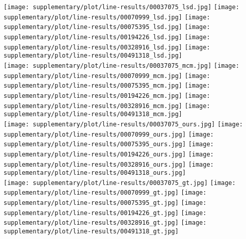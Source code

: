 \documentclass[10pt,twocolumn,letterpaper]{article}
\begin{document}
\begin{figure*}[t]
\centering
\texttt{[image: supplementary/plot/line-results/00037075\_lsd.jpg]}
\texttt{[image: supplementary/plot/line-results/00070999\_lsd.jpg]}
\texttt{[image: supplementary/plot/line-results/00075395\_lsd.jpg]}
\texttt{[image: supplementary/plot/line-results/00194226\_lsd.jpg]}
\texttt{[image: supplementary/plot/line-results/00328916\_lsd.jpg]}
\texttt{[image: supplementary/plot/line-results/00491318\_lsd.jpg]}
\\
\texttt{[image: supplementary/plot/line-results/00037075\_mcm.jpg]}
\texttt{[image: supplementary/plot/line-results/00070999\_mcm.jpg]}
\texttt{[image: supplementary/plot/line-results/00075395\_mcm.jpg]}
\texttt{[image: supplementary/plot/line-results/00194226\_mcm.jpg]}
\texttt{[image: supplementary/plot/line-results/00328916\_mcm.jpg]}
\texttt{[image: supplementary/plot/line-results/00491318\_mcm.jpg]}
\\
\texttt{[image: supplementary/plot/line-results/00037075\_ours.jpg]}
\texttt{[image: supplementary/plot/line-results/00070999\_ours.jpg]}
\texttt{[image: supplementary/plot/line-results/00075395\_ours.jpg]}
\texttt{[image: supplementary/plot/line-results/00194226\_ours.jpg]}
\texttt{[image: supplementary/plot/line-results/00328916\_ours.jpg]}
\texttt{[image: supplementary/plot/line-results/00491318\_ours.jpg]}
\\
\texttt{[image: supplementary/plot/line-results/00037075\_gt.jpg]}
\texttt{[image: supplementary/plot/line-results/00070999\_gt.jpg]}
\texttt{[image: supplementary/plot/line-results/00075395\_gt.jpg]}
\texttt{[image: supplementary/plot/line-results/00194226\_gt.jpg]}
\texttt{[image: supplementary/plot/line-results/00328916\_gt.jpg]}
\texttt{[image: supplementary/plot/line-results/00491318\_gt.jpg]}
\\


\end{figure*}
\end{document}
